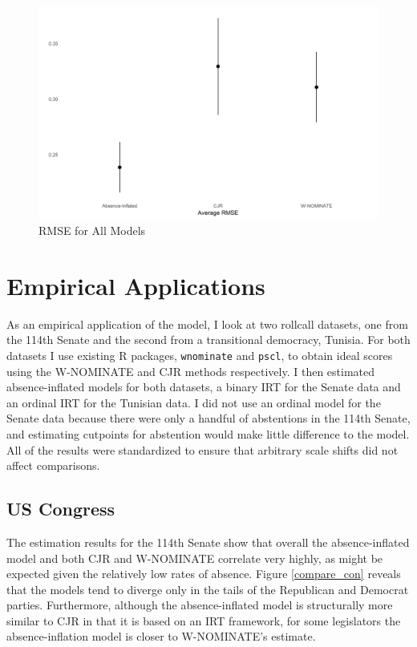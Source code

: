 	\begin{figure}
		\caption{RMSE for All Models}\label{sim_rmse}
		\includegraphics[width=\linewidth]{sim_rmse_allmods}
	\end{figure} 
	
	
	\section*{Empirical Applications}
	
	As an empirical application of the model, I look at two rollcall datasets, one from the 114th Senate and the second from a transitional democracy, Tunisia. For both datasets I use existing R packages, \texttt{wnominate} and \texttt{pscl}, to obtain ideal scores using the W-NOMINATE and CJR methods respectively. I then estimated absence-inflated models for both datasets, a binary IRT for the Senate data and an ordinal IRT for the Tunisian data. I did not use an ordinal model for the Senate data because there were only a handful of abstentions in the 114th Senate, and estimating cutpoints for abstention would make little difference to the model. All of the results were standardized to ensure that arbitrary scale shifts did not affect comparisons.
	
	\subsection*{US Congress}
	
	The estimation results for the 114th Senate show that overall the absence-inflated model and both CJR and W-NOMINATE correlate very highly, as might be expected given the relatively low rates of absence. Figure \ref{compare_con} reveals that the models tend to diverge only in the tails of the Republican and Democrat parties. Furthermore, although the absence-inflated model is structurally more similar to CJR in that it is based on an IRT framework, for some legislators the absence-inflation model is closer to W-NOMINATE's estimate. 
	
